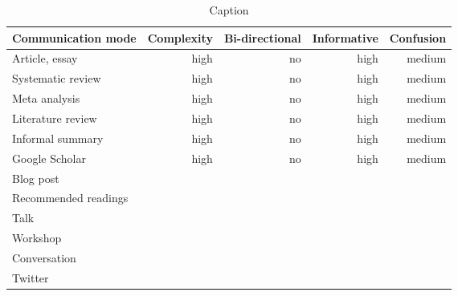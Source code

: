 \begin{table*}\centering
{}
\begin{tabular}{@{}lrrrr@{}}\toprule
Communication mode & Complexity & Bi-directional & Informative  & Confusion
\\\midrule
Article, essay & high & no & high & medium  \\
Systematic review & high & no & high & medium\\
Meta analysis & high & no & high & medium\\
Literature review & high & no & high & medium\\
Informal summary & high & no & high & medium\\
Google Scholar & high & no & high & medium\\
Blog post \\
Recommended readings \\
Talk \\
Workshop \\
Conversation \\
Twitter \\


\bottomrule
\end{tabular}
\caption{Caption}
\end{table*}